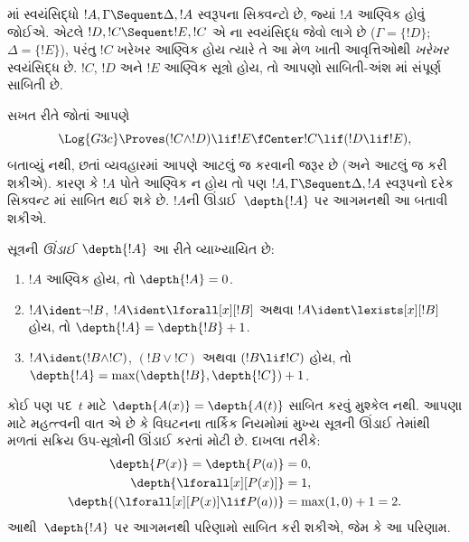 માં સ્વયંસિદ્ધો
$!A, \Gamma \Sequent \Delta, !A$ સ્વરૂપના સિક્વન્ટો છે,
જ્યાં $!A$ આણ્વિક હોવું જોઈએ.
એટલે $!D, !C \Sequent !E, !C$ એ ના
સ્વયંસિદ્ધ જેવો લાગે છે
($\Gamma = \{!D\}$; $\Delta = \{!E\}$),
પરંતુ $!C$ ખરેખર આણ્વિક હોય ત્યારે
તે આ મેળ ખાતી આવૃત્તિઓથી \emph{ખરેખર} સ્વયંસિદ્ધ છે.
$!C$, $!D$ અને $!E$ આણ્વિક સૂત્રો હોય,
તો આપણો સાબિતી-અંશ માં સંપૂર્ણ સાબિતી છે.

સખત રીતે જોતાં આપણે
\[\Log{G3c} \Proves (!C \land !D) \lif !E \fCenter !C \lif (!D \lif
!E),\]
બતાવ્યું નથી, છતાં વ્યવહારમાં આપણે આટલું જ કરવાની
જરૂર છે (અને આટલું જ કરી શકીએ).
કારણ કે $!A$ પોતે આણ્વિક ન હોય તો પણ
$!A, \Gamma \Sequent \Delta, !A$ સ્વરૂપનો દરેક સિક્વન્ટ
માં સાબિત થઈ શકે છે.
$!A$ની ઊંડાઈ~$\depth{!A}$ પર આગમનથી આ બતાવી શકીએ.

\begin{defn}
સૂત્રની \emph{ઊંડાઈ}~$\depth{!A}$ આ રીતે વ્યાખ્યાયિત છે:
\begin{enumerate}
  \item $!A$ આણ્વિક હોય, તો $\depth{!A} = 0$.
  \item $!A \ident \lnot !B$, $!A \ident \lforall[x][!B]$
  અથવા $!A \ident \lexists[x][!B]$ હોય,
  તો $\depth{!A} = \depth{!B} + 1$.
  \item $!A \ident (!B \land !C)$, $(!B \lor !C)$
  અથવા $(!B \lif !C)$ હોય,
  તો $\depth{!A} = \max(\depth{!B},\depth{!C}) + 1$.
\end{enumerate}
\end{defn}

કોઈ પણ પદ~$t$ માટે $\depth{A(x)} = \depth{A(t)}$
સાબિત કરવું મુશ્કેલ નથી.
આપણા માટે મહત્ત્વની વાત એ છે કે વિઘટનના તાર્કિક નિયમોમાં
મુખ્ય સૂત્રની ઊંડાઈ તેમાંથી મળતાં સક્રિય
ઉપ-સૂત્રોની ઊંડાઈ કરતાં મોટી છે.
દાખલા તરીકે:
\begin{align*}
\depth{P(x)} = \depth{P(a)} & = 0,\\
\depth{\lforall[x][P(x)]} & = 1,\\
\depth{(\lforall[x][P(x)] \lif P(a))} & = \max(1,0) + 1 = 2.
\end{align*}
આથી~$\depth{!A}$ પર આગમનથી પરિણામો સાબિત કરી શકીએ,
જેમ કે આ પરિણામ.

